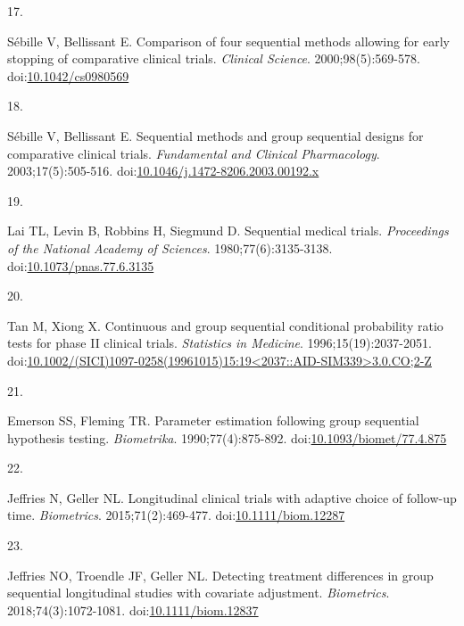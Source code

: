 \documentclass[
  11pt,
]{article}
\newlength{\cslhangindent}
\newlength{\csllabelwidth}
\newenvironment{CSLReferences}[2] %
 {\begin{list}{}{%
  \setlength{\itemindent}{0pt}
  \setlength{\leftmargin}{0pt}
  \setlength{\parsep}{0pt}
  \ifodd #1
   \setlength{\leftmargin}{\cslhangindent}
   \setlength{\itemindent}{-1\cslhangindent}
  \fi
  \setlength{\itemsep}{#2\baselineskip}}}
 {\end{list}}
\newcommand{\CSLLeftMargin}[1]{\parbox[t]{\csllabelwidth}{\strut#1\strut}}
\newcommand{\CSLRightInline}[1]{\parbox[t]{\linewidth - \csllabelwidth}{\strut#1\strut}}
\begin{document}
\begin{CSLReferences}{0}{1}
\CSLLeftMargin{17. }%
\CSLRightInline{Sébille V, Bellissant E. Comparison of four sequential methods allowing for early stopping of comparative clinical trials. \emph{Clinical Science}. 2000;98(5):569-578. doi:\href{https://doi.org/10.1042/cs0980569}{10.1042/cs0980569}}

\CSLLeftMargin{18. }%
\CSLRightInline{Sébille V, Bellissant E. Sequential methods and group sequential designs for comparative clinical trials. \emph{Fundamental and Clinical Pharmacology}. 2003;17(5):505-516. doi:\href{https://doi.org/10.1046/j.1472-8206.2003.00192.x}{10.1046/j.1472-8206.2003.00192.x}}

\CSLLeftMargin{19. }%
\CSLRightInline{Lai TL, Levin B, Robbins H, Siegmund D. Sequential medical trials. \emph{Proceedings of the National Academy of Sciences}. 1980;77(6):3135-3138. doi:\href{https://doi.org/10.1073/pnas.77.6.3135}{10.1073/pnas.77.6.3135}}

\CSLLeftMargin{20. }%
\CSLRightInline{Tan M, Xiong X. Continuous and group sequential conditional probability ratio tests for phase {II} clinical trials. \emph{Statistics in Medicine}. 1996;15(19):2037-2051. doi:\href{https://doi.org/10.1002/(SICI)1097-0258(19961015)15:19\%3C2037::AID-SIM339\%3E3.0.CO;2-Z}{10.1002/(SICI)1097-0258(19961015)15:19\textless2037::AID-SIM339\textgreater3.0.CO;2-Z}}

\CSLLeftMargin{21. }%
\CSLRightInline{Emerson SS, Fleming TR. Parameter estimation following group sequential hypothesis testing. \emph{Biometrika}. 1990;77(4):875-892. doi:\href{https://doi.org/10.1093/biomet/77.4.875}{10.1093/biomet/77.4.875}}

\CSLLeftMargin{22. }%
\CSLRightInline{Jeffries N, Geller NL. Longitudinal clinical trials with adaptive choice of follow-up time. \emph{Biometrics}. 2015;71(2):469-477. doi:\href{https://doi.org/10.1111/biom.12287}{10.1111/biom.12287}}

\CSLLeftMargin{23. }%
\CSLRightInline{Jeffries NO, Troendle JF, Geller NL. Detecting treatment differences in group sequential longitudinal studies with covariate adjustment. \emph{Biometrics}. 2018;74(3):1072-1081. doi:\href{https://doi.org/10.1111/biom.12837}{10.1111/biom.12837}}


\end{CSLReferences}
\end{document}
